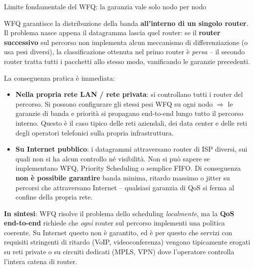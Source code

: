 \documentclass[a4paper,12pt]{report}
\begin{document}
\begin{urgentbox}{Limite fondamentale del WFQ: la garanzia vale solo
nodo per nodo}

WFQ garantisce la distribuzione della banda \textbf{all'interno di un
singolo router}. Il problema nasce appena il datagramma lascia quel
router: se il \textbf{router successivo} sul percorso non implementa
alcun meccanismo di differenziazione (o usa pesi diversi), la
classificazione ottenuta nel primo router è \emph{persa} -- il secondo
router tratta tutti i pacchetti allo stesso modo, vanificando le
garanzie precedenti.

La conseguenza pratica è immediata:

\begin{itemize}
    \item \textbf{Nella propria rete LAN / rete privata}: si
          controllano tutti i router del percorso. Si possono
          configurare gli stessi pesi WFQ su ogni nodo $\Rightarrow$
          le garanzie di banda e priorità si propagano end-to-end
          lungo tutto il percorso interno. Questo è il caso tipico
          delle reti aziendali, dei data center e delle reti degli
          operatori telefonici sulla propria infrastruttura.

    \item \textbf{Su Internet pubblico}: i datagrammi attraversano
          router di ISP diversi, sui quali non si ha alcun controllo
          né visibilità. Non si può sapere se implementano WFQ,
          Priority Scheduling o semplice FIFO. Di conseguenza
          \textbf{non è possibile garantire} banda minima, ritardo
          massimo o jitter su percorsi che attraversano Internet --
          qualsiasi garanzia di QoS si ferma al confine della propria
          rete.
\end{itemize}

\textbf{In sintesi}: WFQ risolve il problema dello scheduling
\emph{localmente}, ma la \textbf{QoS end-to-end} richiede che
\emph{ogni} router sul percorso implementi una politica coerente.
Su Internet questo non è garantito, ed è per questo che servizi
con requisiti stringenti di ritardo (VoIP, videoconferenza) vengono
tipicamente erogati su reti private o su circuiti dedicati (MPLS,
VPN) dove l'operatore controlla l'intera catena di router.
\end{urgentbox}
\end{document}
